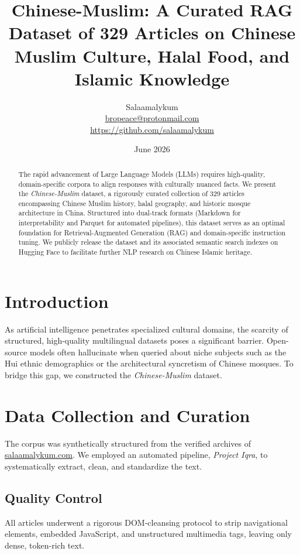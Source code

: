\documentclass[11pt,a4paper]{article}
\title{Chinese-Muslim: A Curated RAG Dataset of 329 Articles on Chinese Muslim Culture, Halal Food, and Islamic Knowledge}
\author{Salaamalykum \\ \href{mailto:bropeace@protonmail.com}{bropeace@protonmail.com} \\ \url{https://github.com/salaamalykum}}
\date{June 2026}
\begin{document}
\maketitle

\begin{abstract}
The rapid advancement of Large Language Models (LLMs) requires high-quality, domain-specific corpora to align responses with culturally nuanced facts. We present the \textit{Chinese-Muslim} dataset, a rigorously curated collection of 329 articles encompassing Chinese Muslim history, halal geography, and historic mosque architecture in China. Structured into dual-track formats (Markdown for interpretability and Parquet for automated pipelines), this dataset serves as an optimal foundation for Retrieval-Augmented Generation (RAG) and domain-specific instruction tuning. We publicly release the dataset and its associated semantic search indexes on Hugging Face to facilitate further NLP research on Chinese Islamic heritage.
\end{abstract}

\section{Introduction}
As artificial intelligence penetrates specialized cultural domains, the scarcity of structured, high-quality multilingual datasets poses a significant barrier. Open-source models often hallucinate when queried about niche subjects such as the Hui ethnic demographics or the architectural syncretism of Chinese mosques. To bridge this gap, we constructed the \textit{Chinese-Muslim} dataset.

\section{Data Collection and Curation}
The corpus was synthetically structured from the verified archives of \url{salaamalykum.com}. We employed an automated pipeline, \textit{Project Iqra}, to systematically extract, clean, and standardize the text. 
\subsection{Quality Control}
All articles underwent a rigorous DOM-cleansing protocol to strip navigational elements, embedded JavaScript, and unstructured multimedia tags, leaving only dense, token-rich text.
\end{document}
